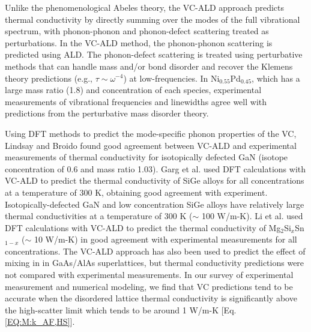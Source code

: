 \documentclass[aps,prb,onecolumn,preprint,footinbib,superscriptaddress,amsmath,amssymb,floatfix]{revtex4}
\begin{document}
Unlike the phenomenological 
Abeles theory, the VC-ALD approach predicts thermal conductivity 
by directly summing over the modes of the full vibrational spectrum, 
with phonon-phonon and phonon-defect scattering treated as 
perturbations.
\cite{garg_role_2011,tian_phonon_2012,lindsay_thermal_2012} 
In the VC-ALD method, the phonon-phonon scattering is  
predicted using ALD.\cite{turney_predicting_2009,
esfarjani_heat_2011} 
The phonon-defect scattering is treated 
using perturbative methods that can handle mass and/or bond disorder 
and recover the Klemens theory predictions 
(e.g., $\tau \sim \omega^{-4}$) at low-frequencies.
\cite{klemens_scattering_1955,klemens_thermal_1957,
mattis_phonon_1957,tamura_isotope_1983} 
In Ni$_{0.55}$Pd$_{0.45}$, 
which has a large mass ratio (1.8) and concentration of each species, 
experimental measurements of   
vibrational frequencies and linewidths agree well with 
predictions from the perturbative mass disorder theory.
\cite{mattis_phonon_1957,kamitakahara_vibrations_1974,
tamura_isotope_1983} 

Using DFT methods to predict 
the mode-specific phonon properties of the VC, Lindsay and Broido 
found good agreement between VC-ALD and experimental measurements of 
thermal conductivity for 
isotopically defected GaN (isotope concentration of 0.6 and 
mass ratio 1.03).\cite{lindsay_thermal_2012} 
Garg et al. used DFT calculations with VC-ALD   
to predict the thermal conductivity of SiGe alloys 
for all concentrations at a temperature of 300 K, 
obtaining good agreement with experiment.\cite{garg_role_2011}  
Isotopically-defected GaN and low concentration SiGe alloys 
have relatively large 
thermal conductivities at a temperature of 300 K ($\sim$ 100 W/m-K). 
Li et al. used DFT calculations with VC-ALD to predict the thermal 
conductivity of Mg$_2$Si$_x$Sn$_{1-x}$ ($\sim$ 10 W/m-K) 
in good agreement with 
experimental measurements for all concentrations.\cite{li_thermal_2012}
The VC-ALD approach has also been used to predict the effect of mixing 
in in GaAs/AlAs superlattices, but thermal 
conductivity predictions were not compared with experimental 
measurements.\cite{luckyanova_coherent_2012}  
In our survey of experimental measurement and numerical modeling, 
we find that 
VC predictions tend to be accurate when the disordered lattice 
thermal conductivity 
is significantly above the high-scatter limit which tends to 
be around 1 W/m-K [Eq. \eqref{EQ:M:k_AF,HS}].
\cite{abeles_lattice_1963,kamitakahara_vibrations_1974,
cahill_thermal_2004,cahill_thermal_2005,
cahill_lattice_1988,garg_role_2011,lindsay_thermal_2012} 
\end{document}
